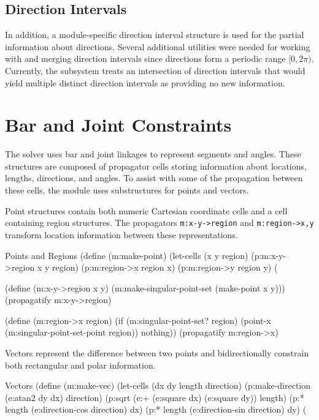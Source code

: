 \subsection{Direction Intervals}

In addition, a module-specific direction interval structure is used
for the partial information about directions. Several additional
utilities were needed for working with and merging direction intervals
since directions form a periodic range $[0,2\pi)$. Currently, the
  subsystem treats an intersection of direction intervals that would
  yield multiple distinct direction intervals as providing no
  new information.

\section{Bar and Joint Constraints}

The solver uses bar and joint linkages to represent segments and
angles. These structures are composed of propagator cells storing
information about locations, lengths, directions, and angles. To
assist with some of the propagation between these cells, the module
uses substructures for points and vectors.

Point structures contain both numeric Cartesian coordinate cells and a cell
containing region structures. The propagators \texttt{m:x-y->region}
and \texttt{m:region->x,y} transform location information between
these representations.

\begin{code-listing}
[label=point-region]
{Points and Regions}
(define (m:make-point)
  (let-cells (x y region)
    (p:m:x-y->region x y region)
    (p:m:region->x region x)
    (p:m:region->y region y)
    (%

(define (m:x-y->region x y)
  (m:make-singular-point-set (make-point x y)))
(propagatify m:x-y->region)

(define (m:region->x region)
  (if (m:singular-point-set? region)
      (point-x (m:singular-point-set-point region))
      nothing))
(propagatify m:region->x)
\end{code-listing}

Vectors represent the difference between two points and bidirectionally
constrain both rectangular and polar information.

\begin{code-listing}
[label=vec-struct]
{Vectors}
(define (m:make-vec)
  (let-cells (dx dy length direction)
    (p:make-direction (e:atan2 dy dx) direction)
    (p:sqrt (e:+ (e:square dx)
                 (e:square dy))
            length)
    (p:* length (e:direction-cos direction) dx)
    (p:* length (e:direction-sin direction) dy)
    (%
\end{code-listing}

